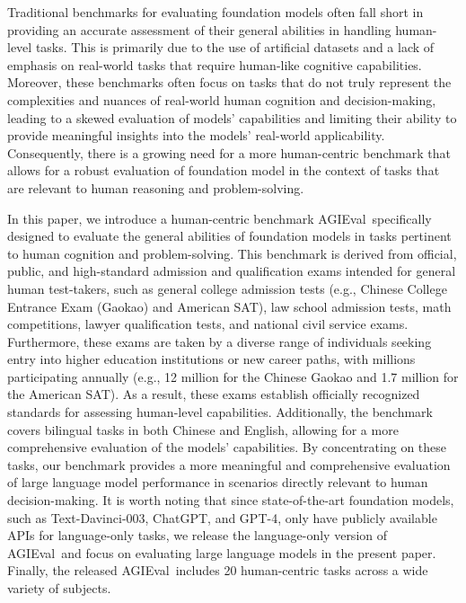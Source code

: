 Traditional benchmarks for evaluating foundation models often fall short in providing an accurate assessment of their general abilities in handling human-level tasks. This is primarily due to the use of artificial datasets and a lack of emphasis on real-world tasks that require human-like cognitive capabilities. Moreover, these benchmarks often focus on tasks that do not truly represent the complexities and nuances of real-world human cognition and decision-making, leading to a skewed evaluation of models' capabilities and limiting their ability to provide meaningful insights into the models' real-world applicability. Consequently, there is a growing need for a more human-centric benchmark that allows for a robust evaluation of foundation model in the context of tasks that are relevant to human reasoning and problem-solving.

In this paper, we introduce a human-centric benchmark {AGIEval}~specifically designed to evaluate the general abilities of foundation models in tasks pertinent to human cognition and problem-solving. This benchmark is derived from official, public, and high-standard admission and qualification exams intended for general human test-takers, such as general college admission tests (e.g., Chinese College Entrance Exam (Gaokao) and American SAT), law school admission tests, math competitions, lawyer qualification tests, and national civil service exams. Furthermore, these exams are taken by a diverse range of individuals seeking entry into higher education institutions or new career paths, with millions participating annually (e.g., 12 million for the Chinese Gaokao and 1.7 million for the American SAT). As a result, these exams establish officially recognized standards for assessing human-level capabilities. Additionally, the benchmark covers bilingual tasks in both Chinese and English, allowing for a more comprehensive evaluation of the models' capabilities. By concentrating on these tasks, our benchmark provides a more meaningful and comprehensive evaluation of large language model performance in scenarios directly relevant to human decision-making. It is worth noting that since state-of-the-art foundation models, such as Text-Davinci-003, ChatGPT, and GPT-4, only have publicly available APIs for language-only tasks, we release the language-only version of {AGIEval}~and focus on evaluating large language models in the present paper. Finally, the released {AGIEval}~includes 20 human-centric tasks across a wide variety of subjects.

